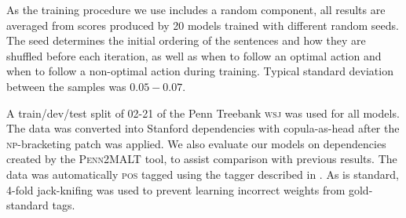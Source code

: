 \documentclass[11pt,letterpaper]{article}
\newcommand{\pos}{\textsc{pos}\xspace}
\newcommand{\wsj}{\textsc{wsj}\xspace}
\begin{document}
As the training procedure we use includes a random component, all results are averaged from scores produced by 20 models trained with
different random seeds. The seed determines the initial ordering of the
sentences and how they are shuffled before each iteration, as well as when to
follow an optimal action and when to follow a non-optimal action during training.
Typical standard deviation between the samples was $0.05-0.07$.




A train/dev/test split of 02-21 of the Penn Treebank \textsc{wsj} \citep{marcus:94}
was used for all models. The data was converted into
Stanford dependencies \citep{stanford_deps} with copula-as-head after the \citet{vadas:07}
\textsc{np}-bracketing patch was applied. We also evaluate our models on
dependencies created by the \textsc{Penn2MALT} tool, to assist comparison 
with previous results.
The data was automatically \pos tagged using the tagger described in \citep{zhang_pos:11}.
As is standard, 4-fold jack-knifing was used to prevent learning incorrect
weights from gold-standard tags.
\end{document}
